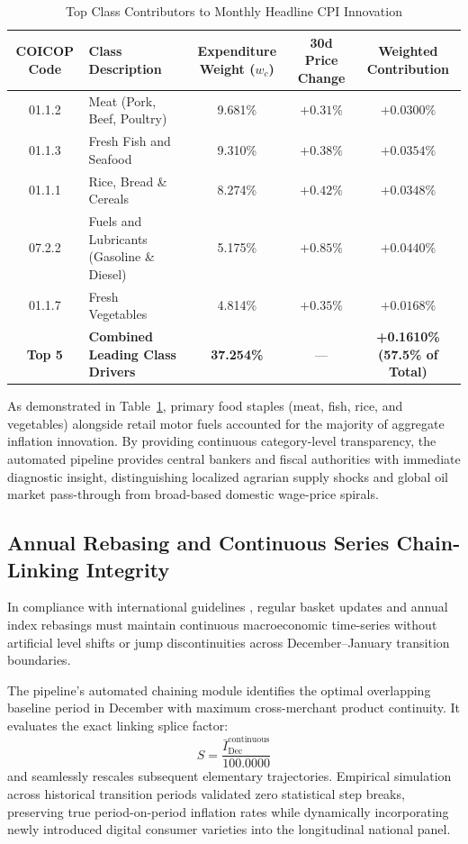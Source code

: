\begin{table}[H]
\centering
\small
\setlength{\tabcolsep}{4pt}
\begin{tabularx}{\textwidth}{|c|>{\raggedright\arraybackslash}X|c|c|c|}
\hline
\rowcolor{blue!20}
\textbf{COICOP Code} & \textbf{Class Description} & \textbf{Expenditure Weight ($w_c$)} & \textbf{30d Price Change} & \textbf{Weighted Contribution} \\ \hline
01.1.2 & Meat (Pork, Beef, Poultry) & 9.681\% & $+0.31\%$ & $+0.0300\%$ \\ \hline
01.1.3 & Fresh Fish and Seafood & 9.310\% & $+0.38\%$ & $+0.0354\%$ \\ \hline
01.1.1 & Rice, Bread \& Cereals & 8.274\% & $+0.42\%$ & $+0.0348\%$ \\ \hline
07.2.2 & Fuels and Lubricants (Gasoline \& Diesel) & 5.175\% & $+0.85\%$ & $+0.0440\%$ \\ \hline
01.1.7 & Fresh Vegetables & 4.814\% & $+0.35\%$ & $+0.0168\%$ \\ \hline
\rowcolor{gray!15}
\textbf{Top 5} & \textbf{Combined Leading Class Drivers} & \textbf{37.254\%} & --- & \textbf{+0.1610\% (57.5\% of Total)} \\ \hline
\end{tabularx}
\caption{Top Class Contributors to Monthly Headline CPI Innovation}
\label{tab:class_contributors}
\end{table}

\hs As demonstrated in Table~\ref{tab:class_contributors}, primary food staples (meat, fish, rice, and vegetables) alongside retail motor fuels accounted for the majority of aggregate inflation innovation. By providing continuous category-level transparency, the automated pipeline provides central bankers and fiscal authorities with immediate diagnostic insight, distinguishing localized agrarian supply shocks and global oil market pass-through from broad-based domestic wage-price spirals.

\subsection{Annual Rebasing and Continuous Series Chain-Linking Integrity}
\hs In compliance with international guidelines \citep{imf2020cpi}, regular basket updates and annual index rebasings must maintain continuous macroeconomic time-series without artificial level shifts or jump discontinuities across December--January transition boundaries.

\hs The pipeline's automated chaining module identifies the optimal overlapping baseline period in December with maximum cross-merchant product continuity. It evaluates the exact linking splice factor:
\begin{equation}
    S = \frac{\bar{I}_{\text{Dec}}^{\text{continuous}}}{100.0000}
\end{equation}
and seamlessly rescales subsequent elementary trajectories. Empirical simulation across historical transition periods validated zero statistical step breaks, preserving true period-on-period inflation rates while dynamically incorporating newly introduced digital consumer varieties into the longitudinal national panel.


